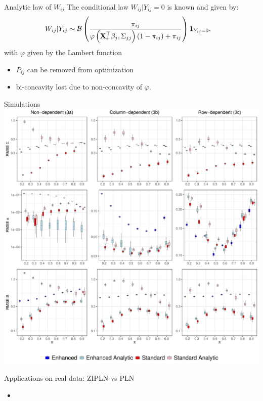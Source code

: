 \documentclass{beamer}
\theoremstyle{remark}
\begin{document}
\begin{frame}{Analytic law of $W_{ij}$}
    The conditional law $W_{ij} | Y_{ij} = 0$ is known and given by:
    \begin{align*}\displaystyle
           W_{ij} | Y_{ij}  &\sim \mathcal B\left(\frac{\pi_{ij}}{ \varphi\left(\boldsymbol{\mathbf{X}}_i^{\top} \beta_j, \Sigma_{jj}\right)
       \left(1 - \pi_{ij}\right) + \pi_{ij}}\right) \mathbf 1_{Y_{ij} = 0},\end{align*}
with $\varphi$ given by the Lambert function

\begin{itemize}
    \item $P_{ij}$ can be removed from optimization
    \item bi-concavity lost due to non-concavity of $\varphi$.
\end{itemize}
\end{frame}
\begin{frame}{Simulations}
    \includegraphics[scale=0.35]{figures/proba_stat.pdf}
\end{frame}
\begin{frame}{Applications on real data: ZIPLN vs PLN}
    \begin{itemize}
        \item
    \end{itemize}

\end{frame}
\end{document}

